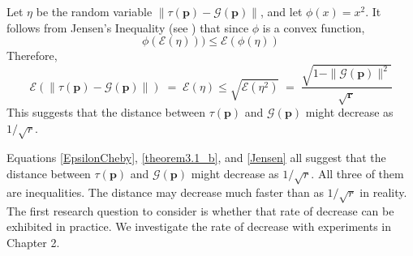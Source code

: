 \begin{itemize}
{Let $\eta$ be the random variable $\| \tau (\bm{p}) - \mathcal{G}(\bm{p}) \|$, and let $\phi (x) = x^2$. 
It follows from Jensen's Inequality (see \cite{JensenInequality}) that 
since $\phi$ is a convex function, 
\[
\phi(\mathcal{E}(\eta))) \leq \mathcal{E}(\phi(\eta)) 
\]
Therefore,
\begin{equation}
\label{Jensen}
\mathcal{E}(\| \tau (\bm{p}) - \mathcal{G}(\bm{p}) \|) \;=\; \mathcal{E}(\eta) \leq \sqrt{\mathcal{E}(\eta^2)} \;=\; \frac{\sqrt{1 - \|\mathcal{G}(\bm{p})\|^2}}{\sqrt{\bm{r}}}
\end{equation}
This suggests that the distance between $\tau (\bm{p})$ and $\mathcal{G}(\bm{p})$ might decrease as $1/\sqrt{r}$. 

Equations \ref{EpsilonCheby}, \ref{theorem3.1_b}, and \ref{Jensen} all suggest that the 
distance between $\tau(\bm{p})$ and $\mathcal{G}(\bm{p})$ might decrease as $1/\sqrt{r}$. 
All three of them are inequalities. The distance may decrease much faster than as $1/\sqrt{r}$ in reality. 
The first research question to consider is whether that rate of decrease can be exhibited 
in practice. We investigate the rate of decrease with experiments in Chapter 2.
}


\end{itemize}
